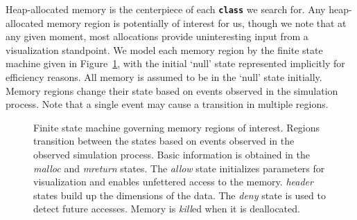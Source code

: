 
Heap-allocated memory is the centerpiece of each
\texttt{\textbf{class}} we search for.  Any heap-allocated memory
region is potentially of interest for us, though we note that at any
given moment, most allocations provide uninteresting input from a
visualization standpoint. We model each memory region by the finite
state machine given in
Figure~\ref{fig:fsm}, with the initial `null' state represented
implicitly for efficiency reasons.  All memory is assumed to be in the
`null' state initially.  Memory regions change their state based on
events observed in the simulation process.  Note that a single event
may cause a transition in multiple regions.

\begin{figure}
  \centering

  \caption{Finite state machine governing memory regions of interest.
  Regions transition between the states based on events observed in
  the observed simulation process.  Basic information is obtained in
  the \emph{malloc} and \emph{mreturn} states.  The \emph{allow} state
  initializes parameters for visualization and enables unfettered
  access to the memory. \emph{header} states build up the dimensions of
  the data.  The \emph{deny} state is used to detect future accesses.
  Memory is \emph{kill}ed when it is deallocated.}
  \label{fig:fsm}

\end{figure}

